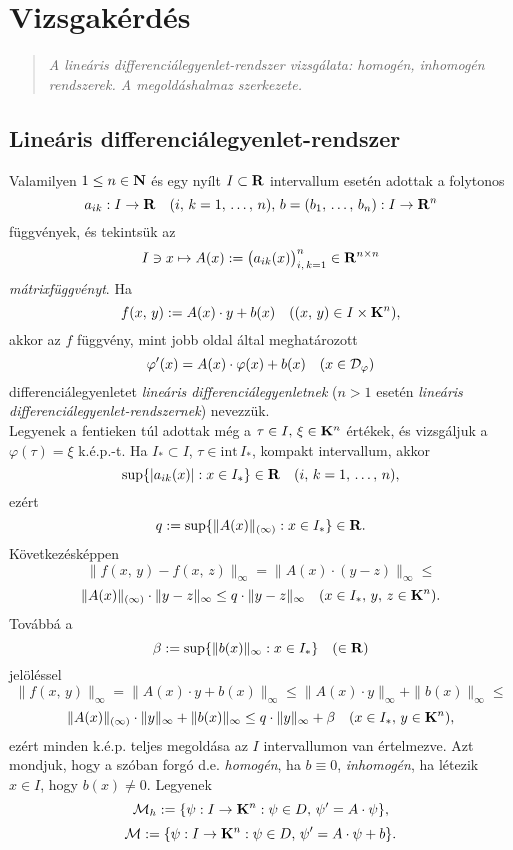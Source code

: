 \newpage
\section{Vizsgakérdés}
\begin{quote}
	\textit{A lineáris differenciálegyenlet-rendszer vizsgálata: homogén, inhomogén rendszerek. A megoldáshalmaz szerkezete.}
\end{quote}

\subsection{Lineáris differenciálegyenlet-rendszer}
Valamilyen $1 \leq n \in \mathbf{N}$ és egy nyílt $I \subset \mathbf{R}$ intervallum esetén adottak a folytonos
\[
a_{ik} : I \to \mathbf{R} \quad (i, \, k = 1, \, \dots, \, n), \, b = (b_1, \, \dots, \, b_n) : I \to \mathbf{R}^n
\]
függvények, és tekintsük az
\[
I \ni x \mapsto A(x) := \big( a_{ik}(x) \big)_{i, \, k =1}^n \in \mathbf{R}^{n \times n}
\]
\textit{mátrixfüggvényt}. Ha
\[
f(x, \, y) := A(x) \cdot y + b(x) \quad ((x, \, y) \in I \times \mathbf{K}^n),
\]
akkor az $f$ függvény, mint jobb oldal által meghatározott
\[
\varphi'(x) = A(x) \cdot \varphi(x) + b(x) \quad (x \in \mathcal{D}_\varphi)
\]
differenciálegyenletet \textit{lineáris differenciálegyenletnek} ($n > 1$ esetén \textit{lineáris} \textit{differenciálegyenlet-rendszernek}) nevezzük.\\

Legyenek a fentieken túl adottak még a $\tau \in I, \, \xi \in \mathbf{K}^n$ értékek, és vizsgáljuk a $\varphi(\tau) = \xi$ k.é.p.-t. Ha $I_* \subset I$, $\tau \in \text{int} \, I_*$, kompakt intervallum, akkor
\[
\sup \{ |a_{ik}(x)| : x \in I_* \} \in \mathbf{R} \quad (i, \, k = 1, \, \dots, \, n),
\]
ezért
\[
q := \sup \{ \|A(x)\|_{(\infty)} : x \in I_* \} \in \mathbf{R}.
\]
Következésképpen
\[
\| f(x, \, y) - f(x, \, z) \|_\infty = \| A(x) \cdot (y- z) \|_\infty \leq
\]
\[
\|A(x)\|_{(\infty)} \cdot \|y-z\|_\infty \leq q \cdot \|y-z\|_\infty \quad (x \in I_*, \, y, \, z \in \mathbf{K}^n).
\]
Továbbá a
\[
\beta := \sup\{\|b(x)\|_\infty : x \in I_*\}  \quad (\in \mathbf{R})
\]
jelöléssel
\[
\|f(x, \, y)\|_\infty = \| A(x) \cdot y + b(x) \|_\infty \leq \|A(x) \cdot y\|_\infty + \|b(x)\|_\infty \leq
\]
\[
\|A(x)\|_{(\infty)} \cdot \|y\|_\infty + \|b(x)\|_\infty \leq q \cdot \|y\|_\infty + \beta \quad (x \in I_*, \, y \in \mathbf{K}^n),
\]
ezért minden k.é.p. teljes megoldása az $I$ intervallumon van értelmezve. Azt mondjuk, hogy a szóban forgó d.e. \textit{homogén}, ha $b \equiv 0$, \textit{inhomogén}, ha létezik $x \in I$, hogy $b(x) \neq 0$. Legyenek
\[
\mathcal{M}_h := \{ \psi : I \to \mathbf{K}^n : \psi \in D, \, \psi' = A \cdot \psi \},
\]
\[
\mathcal{M} := \{ \psi : I \to \mathbf{K}^n : \psi \in D, \, \psi' = A \cdot \psi + b\}.
\]

